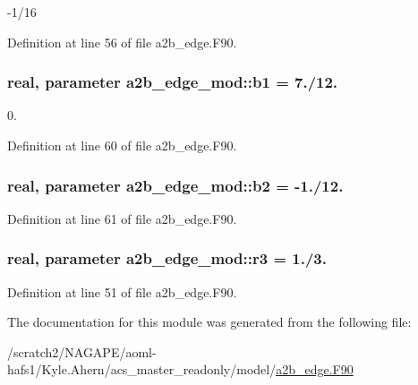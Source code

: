 -\/1/16 



Definition at line 56 of file a2b\-\_\-edge.\-F90.

\subsubsection[{b1}]{\setlength{\rightskip}{0pt plus 5cm}real, parameter a2b\-\_\-edge\-\_\-mod\-::b1 = 7./12.}\label{classa2b__edge__mod_ab63bc73394b22152a35f0785c28d6d6f}


0. 



Definition at line 60 of file a2b\-\_\-edge.\-F90.

\subsubsection[{b2}]{\setlength{\rightskip}{0pt plus 5cm}real, parameter a2b\-\_\-edge\-\_\-mod\-::b2 = -\/1./12.}\label{classa2b__edge__mod_aa319761122e25e2030a5652753d6a9ba}


Definition at line 61 of file a2b\-\_\-edge.\-F90.

\subsubsection[{r3}]{\setlength{\rightskip}{0pt plus 5cm}real, parameter a2b\-\_\-edge\-\_\-mod\-::r3 = 1./3.}\label{classa2b__edge__mod_a719947b05e0bc96f78d35ea3cb071308}


Definition at line 51 of file a2b\-\_\-edge.\-F90.



The documentation for this module was generated from the following file\-:\begin{DoxyCompactItemize}
\item 
/scratch2/\-N\-A\-G\-A\-P\-E/aoml-\/hafs1/\-Kyle.\-Ahern/acs\-\_\-master\-\_\-readonly/model/\hyperlink{a2b__edge_8F90}{a2b\-\_\-edge.\-F90}\end{DoxyCompactItemize}
